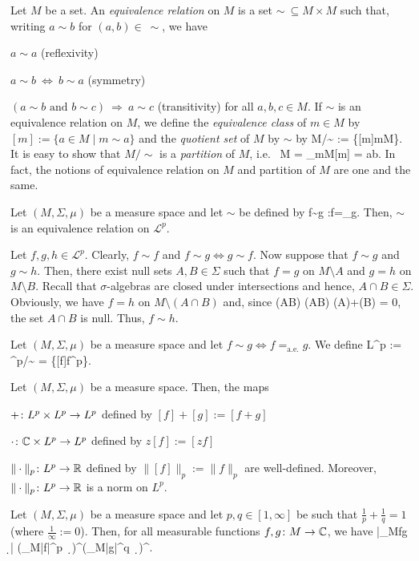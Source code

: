\bd
Let $M$ be a set. An \emph{equivalence relation} on $M$ is a set $\sim\ \subseteq M\times M$ such that, writing $a\sim b$ for $(a,b)\in\ \sim$, we have
\ben[label=(\roman*)]
\item $a\sim a$ \hfill (reflexivity)
\item $a\sim b \ \Leftrightarrow\ b\sim a$ \hfill (symmetry)
\item $(a \sim b \text{ and } b\sim c) \ \Rightarrow \ a\sim c$ \hfill (transitivity)
\een
for all $a,b,c\in M$. If $\sim$ is an equivalence relation on $M$, we define the \emph{equivalence class} of $m\in M$ by $[m]:=\{a\in M \mid m\sim a\}$ and the \emph{quotient set} of $M$ by $\sim$ by
\bse
M/{\sim} := \{[m]\mid m\in M\}.
\ese
\ed
It is easy to show that $M/{\sim}$ is a \emph{partition} of $M$, i.e.\
\bse
M = \bigcup_{m\in M}[m] \qquad {}\qquad [a]\cap [b]=\varnothing {} a\neq b.
\ese
In fact, the notions of equivalence relation on $M$ and partition of $M$ are one and the same.

\bl
Let $(M,\Sigma,\mu)$ be a measure space and let $\sim$ be defined by
\bse
f\sim g \quad :\Leftrightarrow \quad f=_{}g.
\ese
Then, $\sim$ is an equivalence relation on $\mathscr{L}^p$.
\el

\bq
Let $f,g,h\in\mathscr{L}^p$. Clearly, $f\sim f$ and $f\sim g \Leftrightarrow g \sim f$. Now suppose that $f\sim g$ and $g\sim h$. Then, there exist null sets $A,B\in\Sigma$ such that $f=g$ on $M\setminus A$ and $g=h$ on $M\setminus B$. Recall that $\sigma$-algebras are closed under intersections and hence, $A\cap B\in\Sigma$. Obviously, we have $f=h$ on $M\setminus (A\cap B)$ and, since
\bse
\mu(A\cap B) \leq \mu (A\cup B) \leq \mu(A)+\mu(B) = 0,
\ese
the set $A\cap B$ is null. Thus, $f\sim h$.
\eq


\bd
Let $(M,\Sigma,\mu)$ be a measure space and let $f\sim g \Leftrightarrow f=_{\mathrm{a.e.}}g $. We define
\bse
L^p := ^p/{\sim} = \{[f]\mid f\in {}^p\}.
\ese
\ed

\bl
Let $(M,\Sigma,\mu)$ be a measure space. Then, the maps
\ben[label=(\roman*)]
\item $+\colon L^p\times L^p \to L^p$ defined by $[f]+[g]:=[f+g]$
\item $\cdot\colon \mathbb{C}\times L^p \to L^p$ defined by $z[f]:=[zf]$
\item $\|\cdot\|_p\colon L^p \to \mathbb{R}$ defined by $\|[f]\|_p:=\|f\|_p$
\een
are well-defined. Moreover, $\|\cdot\|_p\colon L^p \to \mathbb{R}$ is a norm on $L^p$.
\el

Let $(M,\Sigma,\mu)$ be a measure space and let $p,q\in[1,\infty]$ be such that $\tfrac{1}{p}+\tfrac{1}{q}=1$ (where $\tfrac{1}{\infty}:=0$). Then, for all measurable functions $f,g\colon M\to \mathbb{C}$, we have
\bse
\biggl|\int_M\!fg \, \d \mu \biggr| \leq \biggl(\int_M\!|f|^p \, \d \mu\biggr)^{\negmedspace {}}\biggl(\int_M\!|g|^q \, \d \mu\biggr)^{\negmedspace {}}.
\ese
\el

